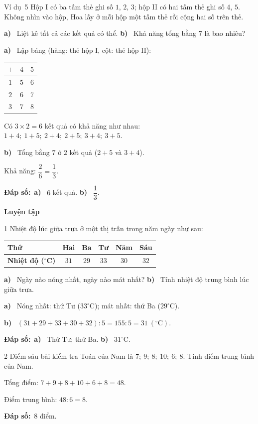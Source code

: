 \documentclass[11pt]{article}
\newif\ifsol \solfalse
\providecommand{\AnsWord}{Đáp số}
\newcommand{\dapso}[1]{\par\textbf{\AnsWord:}\ #1}
\newcommand{\guide}{\par\vspace{4pt}{\bfseries\color{tmBlue}\GuideWord}\par\vspace{3pt}\nopagebreak}
\newcommand{\probsol}[1]{%
  \begin{lrbox}{\solmeasure}\begin{minipage}{\dimexpr\linewidth-24pt\relax}#1\end{minipage}\end{lrbox}%
  \ifsol
    \begin{solbox}#1\end{solbox}%
  \else
    \setlength{\solht}{\dimexpr\ht\solmeasure+\dp\solmeasure+0.85cm\relax}%
    \ifdim\solht<1.35cm\setlength{\solht}{1.35cm}\fi
    \begin{tcolorbox}[colback=white,colframe=Line,boxrule=0.8pt,arc=5pt,
      left=8pt,right=8pt,top=4pt,bottom=4pt,height=\solht]{\footnotesize\color{Slate}\itshape\WorkWord}\end{tcolorbox}%
  \fi}
\newcommand{\dividerbar}[1]{\par\vspace{0.6em}\noindent
  \begin{tcolorbox}[enhanced,frame hidden,interior hidden,borderline west={5pt}{0pt}{ProbBlue},
    colback=white,left=12pt,right=12pt,top=5pt,bottom=5pt,arc=4pt]
  {\large\bfseries\color{ProbBlue} #1}\end{tcolorbox}\vspace{0.4em}}
\newcommand{\pa}[1]{\textbf{#1)}\ }
\newcommand{\gap}{\vspace{0.3cm}}
\def\GuideWord{Hướng dẫn giải.}
\def\WorkWord{Bài làm:}
\def\AnsWord{Đáp số}
\def\ExWord{Ví dụ}
\begin{document}
\begin{exbox}{\ExWord\ 5}
Hộp I có ba tấm thẻ ghi số $1$, $2$, $3$; hộp II có hai tấm thẻ ghi số $4$, $5$. Không nhìn vào hộp, Hoa lấy ở mỗi hộp một tấm thẻ rồi cộng hai số trên thẻ.\par
\pa{a} Liệt kê tất cả các kết quả có thể. \quad \pa{b} Khả năng tổng bằng $7$ là bao nhiêu?
\guide
\pa{a} Lập bảng (hàng: thẻ hộp I, cột: thẻ hộp II):
\begin{center}
\begin{tabular}{|c|c|c|}
\hline
$+$ & $4$ & $5$\\\hline
$1$ & $5$ & $6$\\\hline
$2$ & $6$ & $7$\\\hline
$3$ & $7$ & $8$\\\hline
\end{tabular}
\end{center}
Có $3\times2=6$ kết quả có khả năng như nhau: $1+4;\ 1+5;\ 2+4;\ 2+5;\ 3+4;\ 3+5$.\par
\pa{b} Tổng bằng $7$ ở $2$ kết quả ($2+5$ và $3+4$).\par Khả năng: $\dfrac26=\dfrac13$.
\dapso{\pa{a} $6$ kết quả. \pa{b} $\dfrac13$.}
\end{exbox}
\dividerbar{Luyện tập}
\needspace{5cm}
\begin{probbox}{1}{\relax}
Nhiệt độ lúc giữa trưa ở một thị trấn trong năm ngày như sau:
\begin{center}
\begin{tabular}{|l|c|c|c|c|c|}
\hline
\textbf{Thứ} & Hai & Ba & Tư & Năm & Sáu\\\hline
\textbf{Nhiệt độ ($^\circ$C)} & $31$ & $29$ & $33$ & $30$ & $32$\\\hline
\end{tabular}
\end{center}
\pa{a} Ngày nào nóng nhất, ngày nào mát nhất? \quad \pa{b} Tính nhiệt độ trung bình lúc giữa trưa.
\end{probbox}
\probsol{
\pa{a} Nóng nhất: thứ Tư ($33^\circ$C); mát nhất: thứ Ba ($29^\circ$C).\par
\pa{b} $(31+29+33+30+32):5=155:5=31\ (^\circ\text{C})$.
\dapso{\pa{a} Thứ Tư; thứ Ba. \pa{b} $31^\circ$C.}}
\gap
\begin{probbox}{2}{\relax}
Điểm sáu bài kiểm tra Toán của Nam là $7;\ 9;\ 8;\ 10;\ 6;\ 8$. Tính điểm trung bình của Nam.
\end{probbox}
\probsol{
Tổng điểm: $7+9+8+10+6+8=48$.\par Điểm trung bình: $48:6=8$.
\dapso{$8$ điểm.}}
\end{document}
